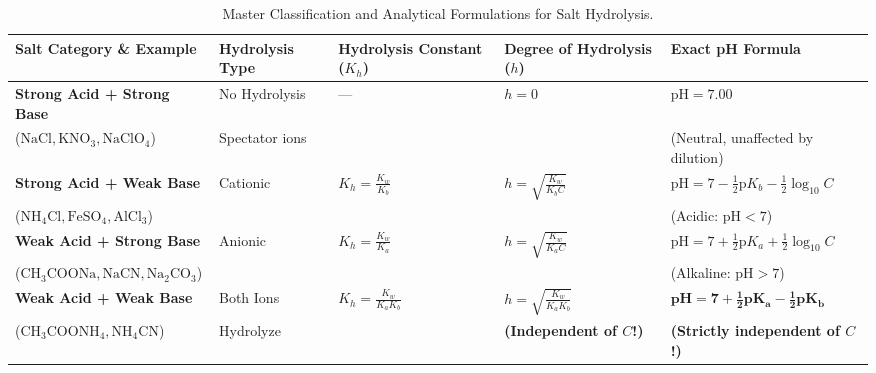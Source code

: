 \documentclass[10pt,a4paper]{article}
\begin{document}
\begin{table}[htbp]
\centering
\small
\renewcommand{\arraystretch}{1.3}
\begin{tabularx}{\textwidth}{p{3.0cm} p{1.8cm} p{2.4cm} p{2.6cm} X}
\toprule
\textbf{Salt Category \& Example} & \textbf{Hydrolysis Type} & \textbf{Hydrolysis Constant ($K_h$)} & \textbf{Degree of Hydrolysis ($h$)} & \textbf{Exact pH Formula} \\
\midrule
\textbf{Strong Acid + Strong Base} & No Hydrolysis & --- & $h = 0$ & $\text{pH} = 7.00$ \\
($\mathrm{NaCl, KNO_3, NaClO_4}$) & Spectator ions & & & (Neutral, unaffected by dilution) \\
\midrule
\textbf{Strong Acid + Weak Base} & Cationic & $K_h = \frac{K_w}{K_b}$ & $h = \sqrt{\frac{K_w}{K_b C}}$ & $\text{pH} = 7 - \frac{1}{2}\text{p}K_b - \frac{1}{2}\log_{10} C$ \\
($\mathrm{NH_4Cl, FeSO_4, AlCl_3}$) & & & & (Acidic: $\text{pH} < 7$) \\
\midrule
\textbf{Weak Acid + Strong Base} & Anionic & $K_h = \frac{K_w}{K_a}$ & $h = \sqrt{\frac{K_w}{K_a C}}$ & $\text{pH} = 7 + \frac{1}{2}\text{p}K_a + \frac{1}{2}\log_{10} C$ \\
($\mathrm{CH_3COONa, NaCN, Na_2CO_3}$) & & & & (Alkaline: $\text{pH} > 7$) \\
\midrule
\textbf{Weak Acid + Weak Base} & Both Ions & $K_h = \frac{K_w}{K_a K_b}$ & $h = \sqrt{\frac{K_w}{K_a K_b}}$ & $\mathbf{\text{pH} = 7 + \frac{1}{2}\text{p}K_a - \frac{1}{2}\text{p}K_b}$ \\
($\mathrm{CH_3COONH_4, NH_4CN}$) & Hydrolyze & & \textbf{(Independent of $C$!)} & \textbf{(Strictly independent of $C$!)} \\
\bottomrule
\end{tabularx}
\caption{Master Classification and Analytical Formulations for Salt Hydrolysis.}
\end{table}
\end{document}
